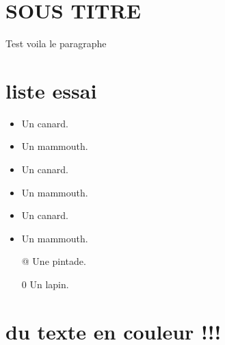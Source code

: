\documentclass[11pt,a4paper,titlepage]{report}
\begin{document}
\section{SOUS TITRE}
Test
voila le paragraphe

\section {liste essai} %
\begin{itemize}
\item Un canard.
\item Un mammouth.
\item Un canard.
\item Un mammouth.
\item Un canard.
\item Un mammouth.
\item[@] Une pintade. %
\item[0] Un lapin.
\end{itemize}
\section{du texte en couleur !!!}
\color{red}{the couleur red}
\color{test}{test}
\end{document}
